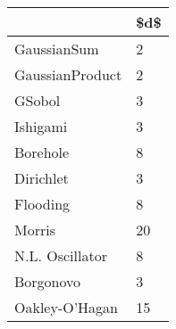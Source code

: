 \begin{tabular}{ll}
\toprule
{} & \$d\$ \\
\midrule
GaussianSum     &   2 \\
GaussianProduct &   2 \\
GSobol          &   3 \\
Ishigami        &   3 \\
Borehole        &   8 \\
Dirichlet       &   3 \\
Flooding        &   8 \\
Morris          &  20 \\
N.L. Oscillator &   8 \\
Borgonovo       &   3 \\
Oakley-O'Hagan  &  15 \\
\bottomrule
\end{tabular}
